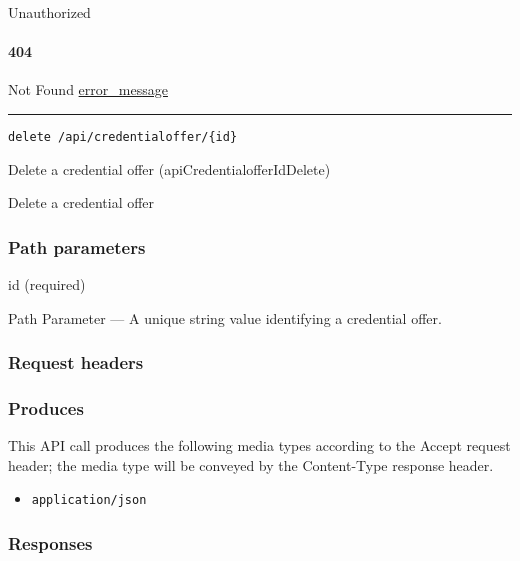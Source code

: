 Unauthorized \protect\hyperlink{}{}

\hypertarget{section-215}{%
\paragraph{404}\label{section-215}}

Not Found \protect\hyperlink{error_message}{error\_message}

\begin{center}\rule{0.5\linewidth}{\linethickness}\end{center}

\protect\hypertarget{apiCredentialofferIdDelete}{}{}

\begin{verbatim}
delete /api/credentialoffer/{id}
\end{verbatim}

Delete a credential offer ({apiCredentialofferIdDelete})

Delete a credential offer

\hypertarget{path-parameters-32}{%
\subsubsection{Path parameters}\label{path-parameters-32}}

id (required)

{Path Parameter} --- A unique string value identifying a credential
offer.

\hypertarget{request-headers-36}{%
\subsubsection{Request headers}\label{request-headers-36}}

\hypertarget{produces-65}{%
\subsubsection{Produces}\label{produces-65}}

This API call produces the following media types according to the
{Accept} request header; the media type will be conveyed by the
{Content-Type} response header.

\begin{itemize}
\tightlist
\item
  \texttt{application/json}
\end{itemize}

\hypertarget{responses-65}{%
\subsubsection{Responses}\label{responses-65}}

